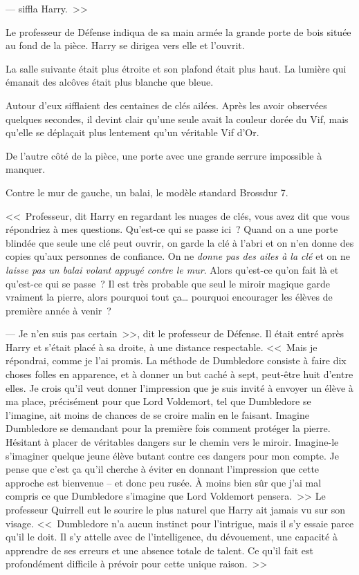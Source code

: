---  siffla Harry.~>>

Le professeur de Défense indiqua de sa main armée la grande porte de bois située au fond de la pièce. Harry se dirigea vers elle et l'ouvrit.

\later

La salle suivante était plus étroite et son plafond était plus haut. La lumière qui émanait des alcôves était plus blanche que bleue.

Autour d'eux sifflaient des centaines de clés ailées. Après les avoir observées quelques secondes, il devint clair qu'une seule avait la couleur dorée du Vif, mais qu'elle se déplaçait plus lentement qu'un véritable Vif d'Or.

De l'autre côté de la pièce, une porte avec une grande serrure impossible à manquer.

Contre le mur de gauche, un balai, le modèle standard Brossdur 7.

<<~Professeur, dit Harry en regardant les nuages de clés, vous avez dit que vous répondriez à mes questions. Qu'est-ce qui se passe ici~? Quand on a une porte blindée que seule une clé peut ouvrir, on garde la clé à l'abri et on n'en donne des copies qu'aux personnes de confiance. On ne \emph{donne pas des ailes à la clé} et on ne \emph{laisse pas un balai volant appuyé contre le mur}. Alors qu'est-ce qu'on fait là et qu'est-ce qui se passe~? Il est très probable que seul le miroir magique garde vraiment la pierre, alors pourquoi tout ça… pourquoi encourager les élèves de première année à venir~?

--- Je n'en suis pas certain~>>, dit le professeur de Défense. Il était entré après Harry et s'était placé à sa droite, à une distance respectable. <<~Mais je répondrai, comme je l'ai promis. La méthode de Dumbledore consiste à faire dix choses folles en apparence, et à donner un but caché à sept, peut-être huit d'entre elles. Je crois qu'il veut donner l'impression que je suis invité à envoyer un élève à ma place, précisément pour que Lord Voldemort, tel que Dumbledore se l'imagine, ait moins de chances de se croire malin en le faisant. Imagine Dumbledore se demandant pour la première fois comment protéger la pierre. Hésitant à placer de véritables dangers sur le chemin vers le miroir. Imagine-le s'imaginer quelque jeune élève butant contre ces dangers pour mon compte. Je pense que c'est ça qu'il cherche à éviter en donnant l'impression que cette approche est bienvenue -- et donc peu rusée. À moins bien sûr que j'ai mal compris ce que Dumbledore s'imagine que Lord Voldemort pensera.~>> Le professeur Quirrell eut le sourire le plus naturel que Harry ait jamais vu sur son visage. <<~Dumbledore n'a aucun instinct pour l'intrigue, mais il s'y essaie parce qu'il le doit. Il s'y attelle avec de l'intelligence, du dévouement, une capacité à apprendre de ses erreurs et une absence totale de talent. Ce qu'il fait est profondément difficile à prévoir pour cette unique raison.~>>

